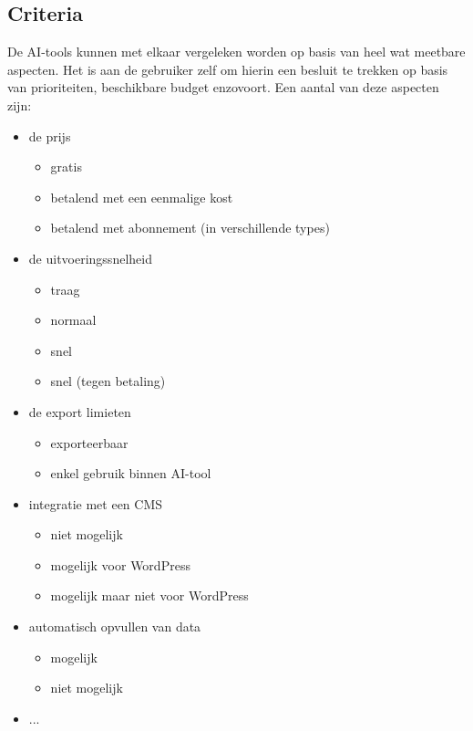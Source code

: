 \subsection{Criteria}
De AI-tools kunnen met elkaar vergeleken worden op basis van heel wat meetbare aspecten. Het is aan de gebruiker zelf om hierin een besluit te trekken op basis van prioriteiten, beschikbare budget enzovoort. Een aantal van deze aspecten zijn:
\begin{itemize}
    \item de prijs
    \begin{itemize}
        \item gratis
        \item betalend met een eenmalige kost
        \item betalend met abonnement (in verschillende types)
    \end{itemize} 
    \item de uitvoeringssnelheid
    \begin{itemize}
        \item traag
        \item normaal
        \item snel
        \item snel (tegen betaling)
    \end{itemize} 
    \item de export limieten
    \begin{itemize}
        \item exporteerbaar
        \item enkel gebruik binnen AI-tool
    \end{itemize}
    \item integratie met een CMS
    \begin{itemize}
        \item niet mogelijk
        \item mogelijk voor WordPress
        \item mogelijk maar niet voor WordPress
    \end{itemize}
    \item automatisch opvullen van data
    \begin{itemize}
        \item mogelijk
        \item niet mogelijk
    \end{itemize}
    \item ...    
\end{itemize} 

